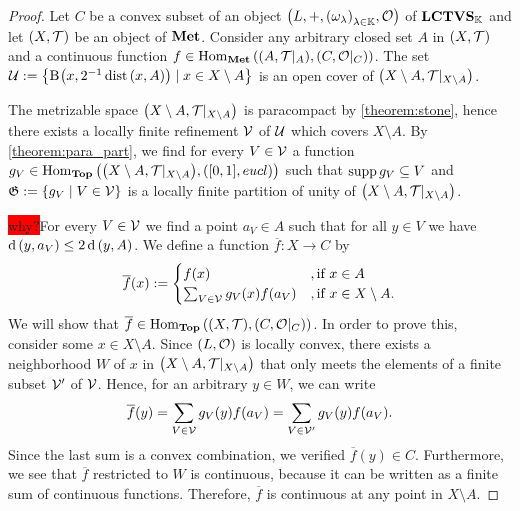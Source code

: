 \begin{proof}
	Let $C$ be a convex subset of an object $\tvspace{\K}$ of $\LCTVS{\K}$ and let $\tspace$ be an object of $\Met$. Consider any arbitrary closed set $A$ in $\tspace$ and a continuous function $f \in \Hom_\Met\pbraces{\reltspace, \reltspace[C][O]}$. The set $\cover := \Bbraces{\ball[x][2^{-1} \dist\pbraces{x, A}] \mid x \in X \setminus A}$ is an open cover of $\reltspace[X\setminus A][T]$. 
	
	The metrizable space $\reltspace[X \setminus A][T]$ is paracompact by \ref{theorem:stone}, hence there exists a locally finite refinement $\cover[V]$ of $\cover$ which covers $X \setminus A$. By \ref{theorem:para_part}, we find for every $V \in \cover[V]$ a function $g_V \in \Hom_\Top\pbraces{\reltspace[X\setminus A][T], \pbraces{[0,1], \eucl}}$ such that $\supp g_V \subseteq V$ and $\partition[G] := \Bbraces{g_V \mid V \in \cover[V]}$ is a locally finite partition of unity of $\reltspace[X \setminus A][T]$.  
	
	\colorbox{red}{why?}For every $V \in \cover[V]$ we find a point $a_V \in A$ such that for all $y \in V$ we have $\metric\pbraces{y, a_V} \leq 2 \metric\pbraces{y, A}$. We define a function $\overline{f}: X \to C$ by
	\begin{align*}
		\overline{f}(x) :=
		\begin{cases}
			f(x) &, \text{if } x \in A \\
			\sum_{V \in \cover[V]} g_V(x) f\pbraces{a_V} &, \text{if } x \in X \setminus A.
		\end{cases}
	\end{align*}
	We will show that $\overline{f} \in \Hom_\Top\pbraces{\tspace, \reltspace[C][O]}$. In order to prove this, consider some $x \in X \setminus A$. Since $\tspace[L][O]$ is locally convex, there exists a neighborhood $W$ of $x$ in $\reltspace[X \setminus A][T]$ that only meets the elements of a finite subset $\cover[V]^\prime$ of $\cover[V]$. Hence, for an arbitrary $y \in W$, we can write
	\begin{align*}
		\overline{f}(y) = \sum_{V \in \cover[V]} g_V(y) f\pbraces{a_V} = \sum_{V \in \cover[V]^\prime} g_V(y) f\pbraces{a_V}.
	\end{align*} 
	Since the last sum is a convex combination, we verified $\overline{f}(y) \in C$. Furthermore, we see that $\overline{f}$ restricted to $W$ is continuous, because it can be written as a finite sum of continuous functions. Therefore, $\overline{f}$ is continuous at any point in $X \setminus A$. 
	

\end{proof}
